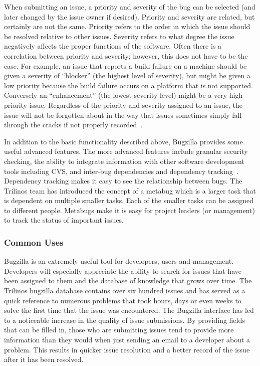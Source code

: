 \documentclass[12pt,relax]{article}
\begin{document}
When submitting an issue, a 
priority and severity of the bug can be selected (and later changed by the 
issue owner if desired).  Priority and severity are related, but certainly are 
not the same.  Priority refers to the order in which the issue should be 
resolved relative to other issues.  Severity refers to what degree the issue 
negatively affects the proper functions of the software.  Often there is a 
correlation between priority and severity; however, this does not have to be
the case.  For example, an issue that reports a build failure on a 
machine should be given a severity of ``blocker'' (the highest level of 
severity), but might be given a low priority because the build failure occurs
on a platform that is not supported.  Conversely an ``enhancement'' (the 
lowest severity level) might be a very high priority issue.  Regardless of the 
priority and severity assigned to an issue, the issue will not be forgotten 
about in the way that issues sometimes simply fall through the cracks if not 
properly recorded~\cite{Bugzilla}.

In addition to the basic functionality described above, Bugzilla provides some 
useful advanced features.  The more advanced features include
granular security checking, the ability to integrate information with 
other software development tools including CVS, and inter-bug 
dependencies and dependency tracking~\cite{Bugzilla}.  Dependency tracking 
makes it easy to see the relationship 
between bugs.  The Trilinos team has introduced the concept of a metabug which 
is a larger task that is dependent on multiple smaller tasks.  Each of the 
smaller tasks can be assigned to different people. Metabugs make it is easy 
for project leaders (or management) to track the status of important issues. 

\subsubsection{Common Uses}

Bugzilla is an extremely useful tool for developers, users and management.  
Developers will especially appreciate the ability to search for issues 
that have been assigned to them and the database of knowledge that grows over
time.  The Trilinos bugzilla database contains over six hundred issues and 
has served as a quick reference to numerous problems that took hours, days 
or even weeks to solve the first time that the issue was encountered.  The 
Bugzilla interface has led to a noticeable increase in the quality of 
issue submissions.  By providing fields that can be filled in, those who are 
submitting issues tend to provide more information than they would when just 
sending an email to a developer about a problem.  This results in quicker 
issue resolution and a better record of the issue after it has been resolved.  
\end{document}
